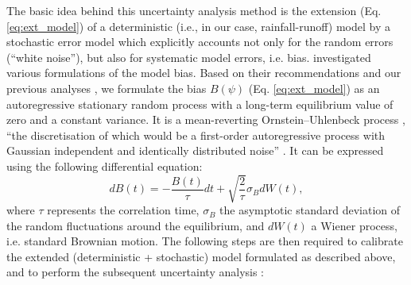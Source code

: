 \documentclass{ctuthesis}\usepackage[]{graphicx}\usepackage[]{color}
\begin{document}
The basic idea behind this uncertainty analysis method is the extension (Eq. \ref{eq:ext_model}) of a deterministic (i.e., in our case, rainfall-runoff) model by a stochastic error model which explicitly accounts not only for the random errors (\enquote{white noise}), but also for systematic model errors, i.e. bias. \cite{giudice2013improving} investigated various formulations of the model bias. Based on their recommendations and our previous analyses \citep{pastorekEffectDifferentRainfall2016}, we formulate the bias $B (\psi)$ (Eq. \ref{eq:ext_model}) as an autoregressive stationary random process with a long-term equilibrium value of zero and a constant variance. It is a mean-reverting Ornstein–Uhlenbeck process \citep{uhlenbeck1930theory}, \enquote{the discretisation of which would be a first-order autoregressive process with Gaussian independent and identically distributed noise} \citep{giudice2013improving}. It can be expressed using the following differential equation:
\begin{equation} \label{error_model}
dB (t)= - \frac{B (t)}{\tau}dt + \sqrt{\frac{2}{\tau}} \sigma_{B}  dW(t),
\end{equation}
where $\tau$ represents the correlation time, $\sigma_{B}$ the asymptotic standard deviation of the random fluctuations around the equilibrium, and $dW(t)$ a Wiener process, i.e. standard Brownian motion. The following steps are then required to calibrate the extended (deterministic + stochastic) model formulated as described above, and to perform the subsequent uncertainty analysis \citep{giudice2013improving}:
\end{document}
